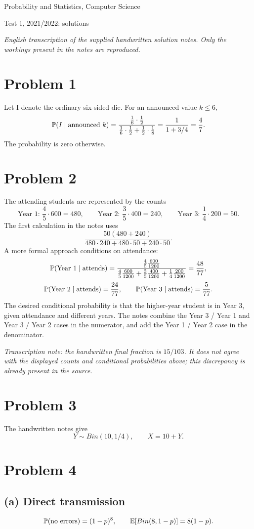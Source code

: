 \documentclass[a4paper]{article}
\begin{document}
\begin{center}\Large Probability and Statistics, Computer Science\par\large Test 1, 2021/2022: solutions\end{center}
\noindent\textit{English transcription of the supplied handwritten solution notes. Only the workings present in the notes are reproduced.}
\section*{Problem 1}
Let I denote the ordinary six-sided die. For an announced value $k\le6$,
\[\P(I\mid\text{announced }k)=\frac{\frac16\cdot\frac12}{\frac16\cdot\frac12+\frac12\cdot\frac18}=\frac1{1+3/4}=\frac47.\]
The probability is zero otherwise.
\section*{Problem 2}
The attending students are represented by the counts
\[\text{Year 1: }\frac45\cdot600=480,\qquad\text{Year 2: }\frac35\cdot400=240,\qquad\text{Year 3: }\frac14\cdot200=50.\]
The first calculation in the notes uses
\[\frac{50(480+240)}{480\cdot240+480\cdot50+240\cdot50}.\]
A more formal approach conditions on attendance:
\[\P(\text{Year 1}\mid\text{attends})=
\frac{\frac45\frac{600}{1200}}{\frac45\frac{600}{1200}+\frac35\frac{400}{1200}+\frac14\frac{200}{1200}}=\frac{48}{77},\]
\[\P(\text{Year 2}\mid\text{attends})=\frac{24}{77},\qquad
\P(\text{Year 3}\mid\text{attends})=\frac5{77}.\]
The desired conditional probability is that the higher-year student is in Year 3, given attendance and different years. The notes combine the Year 3 / Year 1 and Year 3 / Year 2 cases in the numerator, and add the Year 1 / Year 2 case in the denominator.
\par\smallskip\noindent\textit{Transcription note: the handwritten final fraction is $15/103$. It does not agree with the displayed counts and conditional probabilities above; this discrepancy is already present in the source.}
\section*{Problem 3}
The handwritten notes give
\[Y\sim Bin(10,1/4),\qquad X=10+Y.\]
\section*{Problem 4}
\subsection*{(a) Direct transmission}
\[\P(\text{no errors})=(1-p)^8,\qquad\E[Bin(8,1-p)]=8(1-p).\]
\end{document}
